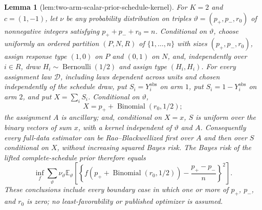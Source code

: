 \documentclass{article}
\newtheorem{lemma}{Lemma}
\begin{document}
\begin{lemma}[lem:two-arm-scalar-prior-schedule-kernel]\label{lem:two-arm-scalar-prior-schedule-kernel}
For \(K=2\) and \(c=(1,-1)\), let \(\nu\) be any probability distribution on triples \(\vartheta=(p_+,p_-,r_0)\) of nonnegative integers satisfying \(p_++p_-+r_0=n\). Conditional on \(\vartheta\), choose uniformly an ordered partition \((P,N,R)\) of \(\{1,\ldots,n\}\) with sizes \((p_+,p_-,r_0)\), assign response type \((1,0)\) on \(P\) and \((0,1)\) on \(N\), and, independently over \(i\in R\), draw \(H_i\sim\operatorname{Bernoulli}(1/2)\) and assign type \((H_i,H_i)\). For every assignment law \(\mathcal D\), including laws dependent across units and chosen independently of the schedule draw, put \(S_i=Y_i^{\mathrm{obs}}\) on arm \(1\), put \(S_i=1-Y_i^{\mathrm{obs}}\) on arm \(2\), and put \(X=\sum_iS_i\). Conditional on \(\vartheta\),
\[
 X=p_++\operatorname{Binomial}(r_0,1/2);
\]
the assignment \(A\) is ancillary; and, conditional on \(X=x\), \(S\) is uniform over the binary vectors of sum \(x\), with a kernel independent of \(\vartheta\) and \(A\). Consequently every full-data estimator can be Rao--Blackwellized first over \(A\) and then over \(S\) conditional on \(X\), without increasing squared Bayes risk. The Bayes risk of the lifted complete-schedule prior therefore equals
\[
 \inf_f\sum_\vartheta\nu_\vartheta
 \mathbb E_\vartheta\!\left[
 \left\{f\!\left(p_++\operatorname{Binomial}(r_0,1/2)\right)
 -\frac{p_+-p_-}{n}\right\}^2\right].
\]
These conclusions include every boundary case in which one or more of \(p_+\), \(p_-\), and \(r_0\) is zero; no least-favorability or published optimizer is assumed.
\end{lemma}
\end{document}
